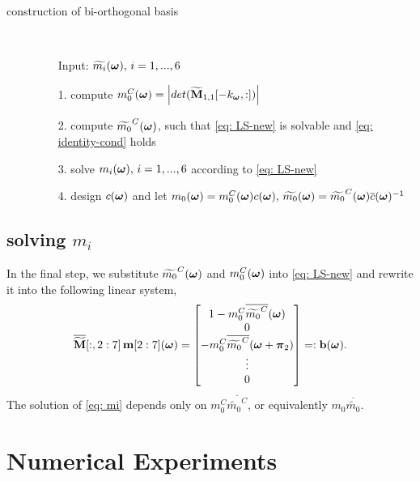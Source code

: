 \begin{description}%
\item[construction of bi-orthogonal basis]\
\begin{itemize}
\item[Input:] $\widetilde{m_{i}}(\boldsymbol{\omega}),\,i=1,...,6$
\item[1.] compute $m_0^C(\boldsymbol{\omega}) = \left|det(\widetilde{\mathbf{M}}_{1,1}[-k_{\boldsymbol{\omega}},:])\right|$
\item[2.] compute $\widetilde{m_{0}}^C(\boldsymbol{\omega})$, such that \eqref{eq: LS-new} is solvable and \eqref{eq: identity-cond} holds
\item[3.] solve $m_i(\boldsymbol{\omega}),\, i=1,...,6$ according to \eqref{eq: LS-new}
\item[4.] design $c(\boldsymbol{\omega})$ and let $m_0(\boldsymbol{\omega}) = m_0^C(\boldsymbol{\omega})c(\boldsymbol{\omega}),\,\widetilde{m_{0}}(\boldsymbol{\omega}) = \widetilde{m_{0}}^C(\boldsymbol{\omega})\overline{c}(\boldsymbol{\omega})^{-1}$
\end{itemize}
\end{description}



\subsection{solving $m_i$}
In the final step, we substitute $\widetilde{m_{0}}^C(\boldsymbol{\omega})$ and $m_0^C(\boldsymbol{\omega})$ into \eqref{eq: LS-new} and rewrite it into the following linear system,
\begin{align}\label{eq: mi}
\overline{\widetilde{\mathbf{M}}}[:,2:7]\,\mathbf{m}[2:7](\boldsymbol{\omega}) = 
\begin{bmatrix}
1-m_0^C\overline{\widetilde{m_0}^C}(\boldsymbol{\omega})\\
0\\
-m_0^C\overline{\widetilde{m_0}^C}(\boldsymbol{\omega}+\boldsymbol{\pi}_2)\\
\vdots \\
0
\end{bmatrix}
=:\mathbf{b}(\boldsymbol{\omega}).
\end{align}
The solution of \eqref{eq: mi} depends only on $m_0^C\overline{\widetilde{m_0}^C}$, or equivalently $m_0\overline{\widetilde{m_0}}$. 


\section{Numerical Experiments}

